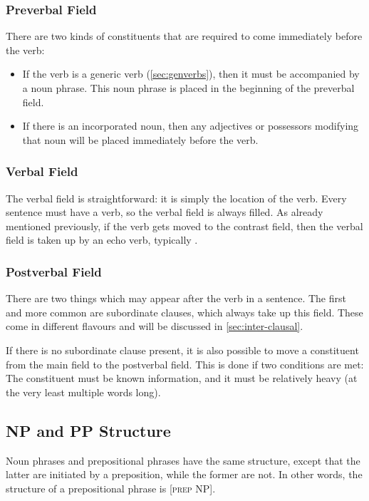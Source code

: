 \documentclass[paper=6in:9in, fontsize=10.5]{scrbook}
\newcommand{\mes}[1]{\hspace{0pt}{\color{teal}#1}}
\newcommand{\rs}{ȿ}
\newcommand{\rz}{ɀ}
\newcommand{\ý}{ɨ́}
\begin{document}
{\subsubsection{Preverbal Field}
There are two kinds of constituents that are required to come immediately before the verb: 

\begin{itemize}
\item If the verb is a generic verb (\ref{sec:genverbs}), then it must be accompanied by a noun phrase. This noun phrase is placed in the beginning of the preverbal field.
\item If there is an incorporated noun, then any adjectives or possessors modifying that noun will be placed immediately before the verb.
\end{itemize}

\subsubsection{Verbal Field}
The verbal field is straightforward: it is simply the location of the verb. Every sentence must have a verb, so the verbal field is always filled. As already mentioned previously, if the verb gets moved to the contrast field, then the verbal field is taken up by an echo verb, typically \mes{\rs{}o\rz-}.

\subsubsection{Postverbal Field}
There are two things which may appear after the verb in a sentence. The first and more common are subordinate clauses, which always take up this field. These come in different flavours and will be discussed in \ref{sec:inter-clausal}.

If there is no subordinate clause present, it is also possible to move a constituent from the main field to the postverbal field. This is done if two conditions are met: The constituent must be known information, and it must be relatively heavy (at the very least multiple words long).



\subsection{NP and PP Structure}
Noun phrases and prepositional phrases have the same structure, except that the latter are initiated by a preposition, while the former are not. In other words, the structure of a prepositional phrase is [\textsc{prep NP}].

}
\end{document}
